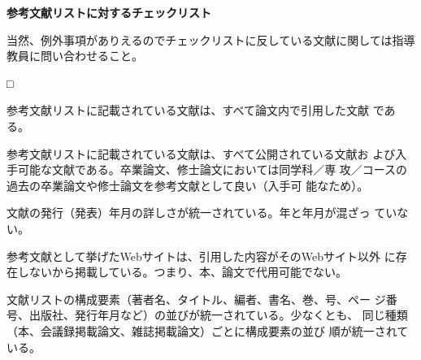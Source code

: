\documentclass[11pt,a4j]{jsarticle}
\begin{document}
\begin{flushleft}
 {\bf 参考文献リストに対するチェックリスト}
\end{flushleft}
当然、例外事項がありえるのでチェックリストに反している文献に関しては指導
教員に問い合わせること。
\begin{list}%
 {□} %
 {} %
 \item 参考文献リストに記載されている文献は、すべて論文内で引用した文献
       である。
 \item 参考文献リストに記載されている文献は、すべて公開されている文献お
       よび入手可能な文献である。卒業論文、修士論文においては同学科／専
       攻／コースの過去の卒業論文や修士論文を参考文献として良い（入手可
       能なため）。
 \item 文献の発行（発表）年月の詳しさが統一されている。年と年月が混ざっ
       ていない。
 \item 参考文献として挙げたWebサイトは、引用した内容がそのWebサイト以外
       に存在しないから掲載している。つまり、本、論文で代用可能でない。
 \item 文献リストの構成要素（著者名、タイトル、編者、書名、巻、号、ペー
       ジ番号、出版社、発行年月など）の並びが統一されている。少なくとも、
       同じ種類（本、会議録掲載論文、雑誌掲載論文）ごとに構成要素の並び
       順が統一されている。
\end{list}
\end{document}
